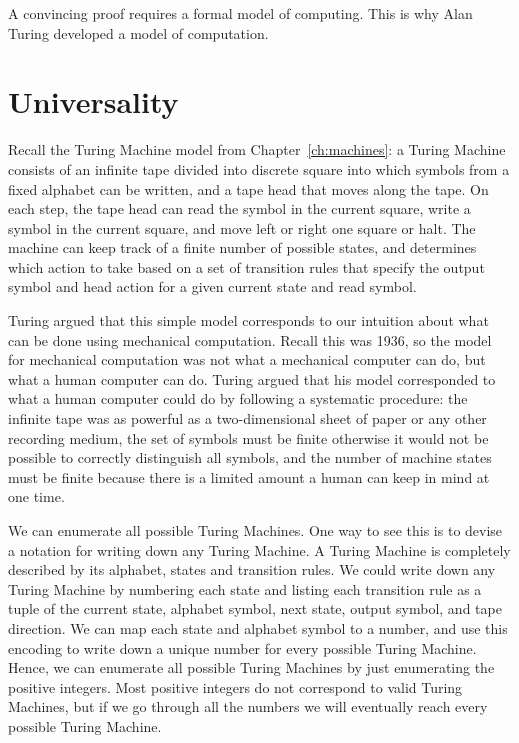 \begin{schemeregion}
A convincing proof requires a formal model of computing.  This is why Alan Turing developed a model of computation.

\section{Universality}\label{sec:universality}

Recall the Turing Machine model from Chapter~\ref{ch:machines}: a Turing Machine consists of an infinite tape divided into discrete square into which symbols from a fixed alphabet can be written, and a tape head that moves along the tape.  On each step, the tape head can read the symbol in the current square, write a symbol in the current square, and move left or right one square or halt.  The machine can keep track of a finite number of possible states, and determines which action to take based on a set of transition rules that specify the output symbol and head action for a given current state and read symbol.

Turing argued that this simple model corresponds to our intuition about what can be done using mechanical computation.  Recall this was 1936, so the model for mechanical computation was not what a mechanical computer can do, but what a human computer can do.  Turing argued that his model corresponded to what a human computer could do by following a systematic procedure: the infinite tape was as powerful as a two-dimensional sheet of paper or any other recording medium, the set of symbols must be finite otherwise it would not be possible to correctly distinguish all symbols, and the number of machine states must be finite because there is a limited amount a human can keep in mind at one time.

We can enumerate all possible Turing Machines.  One way to see this is to devise a notation for writing down any Turing Machine.  A Turing Machine is completely described by its alphabet, states and transition rules.  We could write down any Turing Machine by numbering each state and listing each transition rule as a tuple of the current state, alphabet symbol, next state, output symbol, and tape direction.  We can map each state and alphabet symbol to a number, and use this encoding to write down a unique number for every possible Turing Machine.  Hence, we can enumerate all possible Turing Machines by just enumerating the positive integers.  Most positive integers do not correspond to valid Turing Machines, but if we go through all the numbers we will eventually reach every possible Turing Machine.  


\end{schemeregion}
